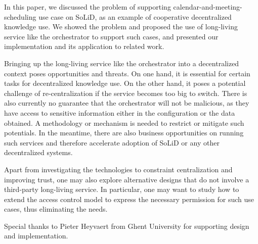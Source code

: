 \documentclass[
twocolumn,
]{ceurart}
\newcommand{\tA}{\emph} %
\newcommand{\aA}{\tA{Alice}}
\begin{document}
In this paper, we discussed the problem of supporting calendar-and-meeting-scheduling use case on SoLiD, as an example of cooperative decentralized knowledge use. We showed the problem and proposed the use of long-living service like the orchestrator to support such cases, and presented our implementation and its application to related work.

Bringing up the long-living service like the orchestrator into a decentralized context poses opportunities and threats. On one hand, it is essential for certain tasks for decentralized knowledge use. On the other hand, it poses a potential challenge of re-centralization if the service becomes too big to switch. There is also currently no guarantee that the orchestrator will not be malicious, as they have access to sensitive information either in the configuration or the data obtained. A methodology or mechanism is needed to restrict or mitigate such potentials.
In the meantime, there are also business opportunities on running such services and therefore accelerate adoption of SoLiD or any other decentralized systems.

Apart from investigating the technologies to constraint centralization and improving trust, one may also explore alternative designs that do not involve a third-party long-living service. In particular, one may want to study how to extend the access control model to express the necessary permission for such use cases, thus eliminating the needs.

\begin{acknowledgments}
Special thanks to Pieter Heyvaert from Ghent University for supporting design and implementation.
\end{acknowledgments}



\end{document}
